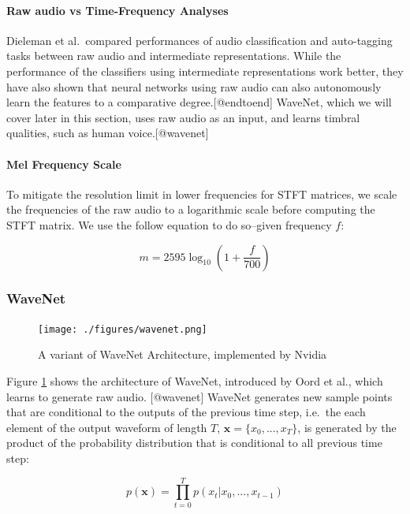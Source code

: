 \documentclass[]{article}
\begin{document}
\paragraph{Raw audio vs Time-Frequency Analyses}

Dieleman et al.~compared performances of audio classification and
auto-tagging tasks between raw audio and intermediate representations.
While the performance of the classifiers using intermediate
representations work better, they have also shown that neural networks
using raw audio can also autonomously learn the features to a
comparative degree.{[}@endtoend{]} WaveNet, which we will cover later in
this section, uses raw audio as an input, and learns timbral qualities,
such as human voice.{[}@wavenet{]}

\paragraph{Mel Frequency Scale}

To mitigate the resolution limit in lower frequencies for STFT matrices,
we scale the frequencies of the raw audio to a logarithmic scale before
computing the STFT matrix. We use the follow equation to do so--given
frequency \(f\):

\begin{equation}
    m = 2595 \log_{10} (1 + \frac{f}{700})
\end{equation}

\hypertarget{wavenet}{%
\subsubsection{WaveNet}\label{wavenet}}

\begin{figure}[!h]
    \texttt{[image: ./figures/wavenet.png]}
    \centering
    \caption{A variant of WaveNet Architecture, implemented by Nvidia} \label{fig:wavenet}
\end{figure}

Figure \ref{fig:wavenet} shows the architecture of WaveNet, introduced
by Oord et al., which learns to generate raw audio. {[}@wavenet{]}
WaveNet generates new sample points that are conditional to the outputs
of the previous time step, i.e.~the each element of the output waveform
of length \(T\), \(\mathbf{x} = \{x_0, ..., x_T\}\), is generated by the
product of the probability distribution that is conditional to all
previous time step:

\begin{equation}
    p(\mathbf{x}) = \prod_{t=0}^{T} p(x_t | x_0, ..., x_{t-1})
\end{equation}
\end{document}
